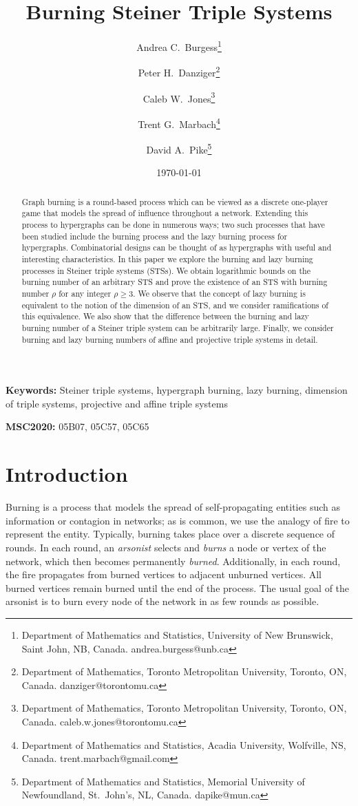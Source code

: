 \documentclass[12pt]{article}
\title{Burning Steiner Triple Systems}
\author{Andrea C.~Burgess\thanks{Department of Mathematics and Statistics, University of New Brunswick, Saint John, NB, Canada.  andrea.burgess@unb.ca} \and Peter H.~Danziger\thanks{Department of Mathematics, Toronto Metropolitan University, Toronto, ON, Canada. danziger@torontomu.ca} \and Caleb W.~Jones\thanks{Department of Mathematics, Toronto Metropolitan University, Toronto, ON, Canada. caleb.w.jones@torontomu.ca}
\and
Trent G.~Marbach\thanks{Department of Mathematics and Statistics, Acadia University, Wolfville, NS, Canada. trent.marbach@gmail.com} \and David A.~Pike\thanks{Department of Mathematics and Statistics, Memorial University of Newfoundland, St.~John's, NL, Canada.  dapike@mun.ca}}
\theoremstyle{definition}
\numberwithin{table}{section}
\begin{document}
\date{\today}
\maketitle


\begin{abstract}
Graph burning is a round-based process which can be viewed as a discrete one-player game that models the spread of influence throughout a network. 
Extending this process to hypergraphs can be done in numerous ways; two such processes that have been studied include the burning process and the lazy burning process for hypergraphs. 
Combinatorial designs can be thought of as hypergraphs with useful  and interesting characteristics. 
In this paper we explore the burning and lazy burning processes in Steiner triple systems (STSs). 
We obtain logarithmic bounds on the burning number of an arbitrary STS and prove the existence of an STS with burning number $\rho$ for any integer $\rho \geq 3$. We observe that the concept of lazy burning is equivalent to the notion of the dimension of an STS, and we consider ramifications of this equivalence. 
We also show that the difference between the burning and lazy burning number of a Steiner triple system can be arbitrarily large.
Finally, we consider burning and lazy burning numbers of affine and projective triple systems in detail.
\end{abstract}

{\bf Keywords:}  Steiner triple systems, hypergraph burning, lazy burning, dimension of triple systems, projective and affine triple systems

{\bf MSC2020:} 05B07, 05C57, 05C65

\section{Introduction}
\label{intro}


Burning is a process that models the spread of self-propagating entities such as information or contagion in networks; as is common, we use the analogy of fire to represent the entity.
Typically, burning takes place over a discrete sequence of rounds. In each round, an {\em arsonist} selects and {\em burns} a node or vertex of the network, which then becomes permanently {\em burned}. Additionally, in each round, the fire propagates from burned vertices to adjacent unburned vertices.  All burned vertices remain burned until the end of the process.
The usual goal of the arsonist is to burn every node of the network in as few rounds as possible. 
\end{document}
